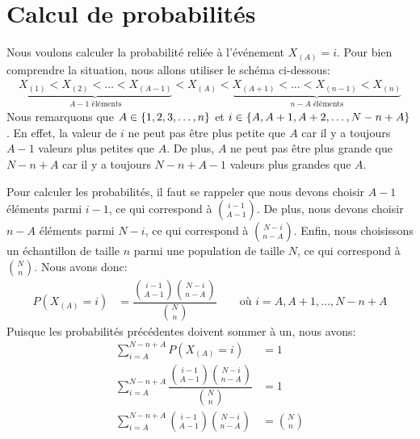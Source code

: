 \documentclass[10pt]{article}
\begin{document}
\hypertarget{calcul-de-probabilites}{%
\section{\texorpdfstring{Calcul de probabilités
\label{calculs_proba}}{Calcul de probabilités }}\label{calcul-de-probabilites}}

Nous voulons calculer la probabilité reliée à l'événement \(X_{(A)}=i\).
Pour bien comprendre la situation, nous allons utiliser le schéma
ci-dessous: \begin{align*}
\underbrace{X_{(1)} <  X_{(2)} < \ldots < X_{(A-1)}}_{A-1 \text{ éléments}} 
< X_{(A)} 
< \underbrace{X_{(A+1)} < \ldots < X_{(n-1)} < X_{(n)}}_{n-A \text{ éléments}}
\end{align*} Nous remarquons que \(A\in\left\{1,2,3,\ldots, n\right\}\) et
\(i\in\left\{A,A+1,A+2,\ldots,N-n+A\right\}\). En effet, la valeur de \(i\) ne
peut pas être plus petite que \(A\) car il y a toujours \(A-1\) valeurs
plus petites que \(A\). De plus, \(A\) ne peut pas être plus grande que
\(N-n+A\) car il y a toujours \(N-n+A-1\) valeurs plus grandes que
\(A\).

Pour calculer les probabilités, il faut se rappeler que nous devons
choisir \(A-1\) éléments parmi \(i-1\), ce qui correspond à
\(\binom{i-1}{A-1}\). De plus, nous devons choisir \(n-A\) éléments
parmi \(N-i\), ce qui correspond à \(\binom{N-i}{n-A}\). Enfin, nous
choisissons un échantillon de taille \(n\) parmi une population de
taille \(N\), ce qui correspond à \(\binom{N}{n}\). Nous avons donc:
\begin{align*}
P(X_{(A)}=i) &= \dfrac{\binom{i-1}{A-1}\binom{N-i}{n-A}}{\binom{N}{n}} \qquad \text{où } i=A,A+1,\ldots,N-n+A
\end{align*} Puisque les probabilités précédentes doivent sommer à un,
nous avons: \begin{align}
\sum_{i=A}^{N-n+A} P(X_{(A)}=i) &= 1 \nonumber\\
\sum_{i=A}^{N-n+A} \dfrac{\binom{i-1}{A-1}\binom{N-i}{n-A}}{\binom{N}{n}} &= 1 \nonumber\\
\sum_{i=A}^{N-n+A} \binom{i-1}{A-1}\binom{N-i}{n-A} &= \binom{N}{n} \label{eq:sumxA}
\end{align}
\end{document}
